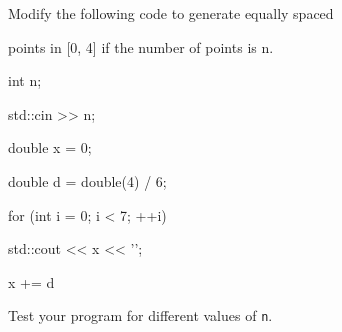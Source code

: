  Modify the following code to generate equally spaced

points in [0, 4] if the number of points is n.

\begin{console}

int n;

std::cin >> n;

double x = 0;

double d = double(4) / 6;

for (int i = 0; i < 7; ++i)

{   

    std::cout << x << '\n';

    x += d

}

\end{console}

Test your program for different values of \texttt{n}.

